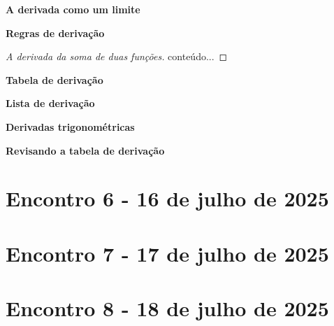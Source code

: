 \documentclass[12pt,openright,twoside,a4paper]{article}
\theoremstyle{definition}
\begin{document}
	\textbf{A derivada como um limite}
	
	\textbf{Regras de derivação}
	
	\begin{proof}[A derivada da soma de duas funções]
		conteúdo...
	\end{proof}
	
	\textbf{Tabela de derivação}
	
	\textbf{Lista de derivação}
	
	\textbf{Derivadas trigonométricas}
	
	\textbf{Revisando a tabela de derivação}
	
	\pagebreak
	\section{Encontro 6 - 16 de julho de 2025}
	
	\pagebreak
	\section{Encontro 7 - 17 de julho de 2025}
	
	\pagebreak
	\section{Encontro 8 - 18 de julho de 2025}
	
	\newpage
	\printbibliography
\end{document}
